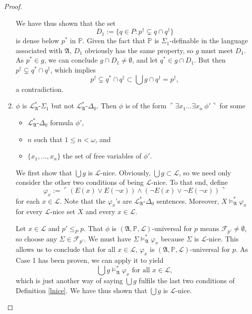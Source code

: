 \documentclass[12pt]{article}
\numberwithin{equation}{section}
\begin{document}
\begin{proof}
\begin{enumerate}[label=Case \arabic*:, leftmargin=50pt]
    We have thus shown that the set $$D_1 := \{q \in P : p^{\dagger} \subsetneq q \cap q^{\dagger}\}$$ is dense below $p^*$ in $\mathbb{P}$. Given the fact that $\mathbb{P}$ is $\Sigma_1$-definable in the language associated with $\mathfrak{A}$, $D_1$ obviously has the same property, so $g$ must meet $D_1$. As $p^* \in g$, we can conclude $g \cap D_1 \neq \emptyset$, and let $q^* \in g \cap D_1$. But then $p^{\dagger} \subsetneq q^* \cap q^{\dagger}$, which implies $$p^{\dagger} \subsetneq q^* \cap q^{\dagger} \subset \bigcup g \cap q^{\dagger} = p^{\dagger},$$ a contradiction. 
    
    \item $\phi$ is $\mathcal{L}^{*}_{\mathfrak{A}}$-$\Sigma_1$ but not $\mathcal{L}^{*}_{\mathfrak{A}}$-$\Delta_0$. Then $\phi$ is of the form $\ulcorner \exists x_1 ... \exists x_n \ \phi' \urcorner$ for some 
    \begin{itemize}
        \item $\mathcal{L}^{*}_{\mathfrak{A}}$-$\Delta_0$ formula $\phi'$,
        \item $n$ such that $1 \leq n < \omega$, and
        \item $\{x_1, ..., x_n\}$ the set of free variables of $\phi'$.
    \end{itemize} 
    
    We first show that $\bigcup g$ is $\mathcal{L}$-nice. Obviously, $\bigcup g \subset \mathcal{L}$, so we need only consider the other two conditions of being $\mathcal{L}$-nice. To that end, define $$\varphi_x := \ulcorner (E(x) \vee E(\neg x)) \wedge (\neg E(x) \vee \neg E(\neg x)) \urcorner$$ for each $x \in \mathcal{L}$. Note that the $\varphi_x$'s are $\mathcal{L}^{*}_{\mathfrak{A}}$-$\Delta_0$ sentences. Moreover, $X \models^{*}_{\mathfrak{A}} \varphi_x$ for every $\mathcal{L}$-nice set $X$ and every $x \in \mathcal{L}$. 
    
    Let $x \in \mathcal{L}$ and $p' \leq_{P} p$. That $\phi$ is $(\mathfrak{A}, \mathbb{P}, \mathcal{L})$-universal for $p$ means $\mathcal{F}_{p'} \neq \emptyset$, so choose any $\Sigma \in \mathcal{F}_{p'}$. We must have $\Sigma \models^{*}_{\mathfrak{A}} \varphi_x$ because $\Sigma$ is $\mathcal{L}$-nice. This allows us to conclude that for all $x \in \mathcal{L}$, $\varphi_x$ is $(\mathfrak{A}, \mathbb{P}, \mathcal{L})$-universal for $p$. As Case 1 has been proven, we can apply it to yield $$\bigcup g \models^{*}_{\mathfrak{A}} \varphi_x \text{ for all } x \in \mathcal{L},$$ which is just another way of saying $\bigcup g$ fulfils the last two conditions of Definition \ref{lnice}. We have thus shown that $\bigcup g$ is $\mathcal{L}$-nice. 
    

\end{enumerate}
\end{proof}
\end{document}
